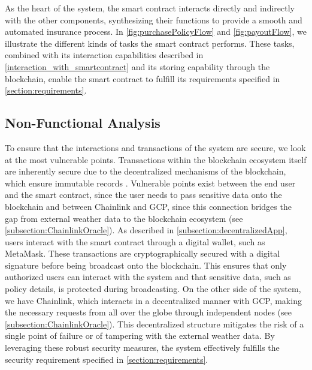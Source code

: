 As the heart of the system, the smart contract interacts directly and indirectly with the other components, synthesizing their functions to provide a smooth and automated insurance process. In \cref{fig:purchasePolicyFlow} and \cref{fig:payoutFlow}, we illustrate the different kinds of tasks the smart contract performs. These tasks, combined with its interaction capabilities described in \cref{interaction_with_smartcontract} and its storing capability through the blockchain, enable the smart contract to fulfill its requirements specified in \cref{section:requirements}.

\subsection{Non-Functional Analysis}\label{non_functional_analysis}
To ensure that the interactions and transactions of the system are secure, we look at the most vulnerable points. Transactions within the blockchain ecosystem itself are inherently secure due to the decentralized mechanisms of the blockchain, which ensure immutable records \autocite{Cheng2020A}. Vulnerable points exist between the end user and the smart contract, since the user needs to pass sensitive data onto the blockchain and between Chainlink and GCP, since this connection bridges the gap from external weather data to the blockchain ecosystem (see \cref{subsection:ChainlinkOracle}). As described in \cref{subsection:decentralizedApp}, users interact with the smart contract through a digital wallet, such as MetaMask. These transactions are cryptographically secured with a digital signature before being broadcast onto the blockchain. This ensures that only authorized users can interact with the system and that sensitive data, such as policy details, is protected during broadcasting. On the other side of the system, we have Chainlink, which interacts in a decentralized manner with GCP, making the necessary requests from all over the globe through independent nodes (see \cref{subsection:ChainlinkOracle}). This decentralized structure mitigates the risk of a single point of failure or of tampering with the external weather data. By leveraging these robust security measures, the system effectively fulfills the security requirement specified in \cref{section:requirements}.

